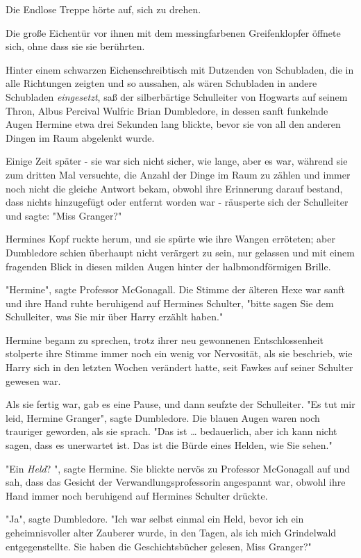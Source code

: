 {Die Endlose Treppe hörte auf, sich zu drehen.

Die große Eichentür vor ihnen mit dem messingfarbenen Greifenklopfer öffnete sich, ohne dass sie sie berührten.

Hinter einem schwarzen Eichenschreibtisch mit Dutzenden von Schubladen, die in alle Richtungen zeigten und so aussahen, als wären Schubladen in andere Schubladen \emph{eingesetzt}, saß der silberbärtige Schulleiter von Hogwarts auf seinem Thron, Albus Percival Wulfric Brian Dumbledore, in dessen sanft funkelnde Augen Hermine etwa drei Sekunden lang blickte, bevor sie von all den anderen Dingen im Raum abgelenkt wurde.

Einige Zeit später - sie war sich nicht sicher, wie lange, aber es war, während sie zum dritten Mal versuchte, die Anzahl der Dinge im Raum zu zählen und immer noch nicht die gleiche Antwort bekam, obwohl ihre Erinnerung darauf bestand, dass nichts hinzugefügt oder entfernt worden war - räusperte sich der Schulleiter und sagte: "Miss Granger?"

Hermines Kopf ruckte herum, und sie spürte wie ihre Wangen erröteten; aber Dumbledore schien überhaupt nicht verärgert zu sein, nur gelassen und mit einem fragenden Blick in diesen milden Augen hinter der halbmondförmigen Brille.

"Hermine", sagte Professor McGonagall. Die Stimme der älteren Hexe war sanft und ihre Hand ruhte beruhigend auf Hermines Schulter, "bitte sagen Sie dem Schulleiter, was Sie mir über Harry erzählt haben."

Hermine begann zu sprechen, trotz ihrer neu gewonnenen Entschlossenheit stolperte ihre Stimme immer noch ein wenig vor Nervosität, als sie beschrieb, wie Harry sich in den letzten Wochen verändert hatte, seit Fawkes auf seiner Schulter gewesen war.

Als sie fertig war, gab es eine Pause, und dann seufzte der Schulleiter. "Es tut mir leid, Hermine Granger", sagte Dumbledore. Die blauen Augen waren noch trauriger geworden, als sie sprach. "Das ist … bedauerlich, aber ich kann nicht sagen, dass es unerwartet ist. Das ist die Bürde eines Helden, wie Sie sehen."

"Ein \emph{Held}? ", sagte Hermine. Sie blickte nervös zu Professor McGonagall auf und sah, dass das Gesicht der Verwandlungsprofessorin angespannt war, obwohl ihre Hand immer noch beruhigend auf Hermines Schulter drückte.

"Ja", sagte Dumbledore. "Ich war selbst einmal ein Held, bevor ich ein geheimnisvoller alter Zauberer wurde, in den Tagen, als ich mich Grindelwald entgegenstellte. Sie haben die Geschichtsbücher gelesen, Miss Granger?"

}
